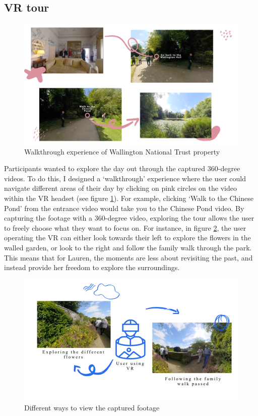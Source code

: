 \subsection{VR tour}
\label{VRTour}

\begin{figure}[htp]
\centering
\includegraphics[width=.8\linewidth]{Images/ChapterFour/WalktrhoughOfWallington.png}
\caption{Walkthrough experience of Wallington National Trust property}
\label{fig:wallingtonTrust}
\end{figure}

Participants wanted to explore the day out through the captured 360-degree videos. To do this, I designed a ‘walkthrough’ experience where the user could navigate different areas of their day by clicking on pink circles on the video within the VR headset (see figure \ref{fig:wallingtonTrust}). For example, clicking `Walk to the Chinese Pond’ from the entrance video would take you to the Chinese Pond video. By capturing the footage with a 360-degree video, exploring the tour allows the user to freely choose what they want to focus on. For instance, in figure \ref{fig:capturedFootage}, the user operating the VR can either look towards their left to explore the flowers in the walled garden, or look to the right and follow the family walk through the park. This means that for Lauren, the moments are less about revisiting the past, and instead provide her freedom to explore the surroundings. 

\begin{figure}[htp]
\centering
\includegraphics[width=.8\linewidth]{Images/ChapterFour/WaysToViewCapturedFootage.png}
\caption{Different ways to view the captured footage}
\label{fig:capturedFootage}
\end{figure}

